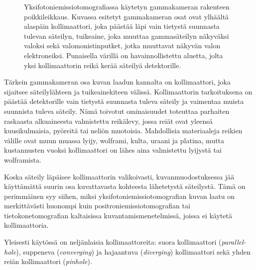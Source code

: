 \begin{figure}[H]
    \centering
    \captionsetup{width=.9\textwidth}
    
    \caption{Yksifotoniemissiotomografiassa käytetyn gammakameran rakenteen poikkileikkaus. Kuvassa esitetyt gammakameran osat ovat ylhäältä alaspäin kollimaattori, joka päästää läpi vain tietystä suunnasta tulevan säteilyn, tuikeaine, joka muuttaa gammasäteilyn näkyväksi valoksi sekä valomonistinputket, jotka muuttavat näkyvän valon elektroneiksi. Punaisella värillä on havainnollistettu aluetta, jolta yksi kollimaattorin reikä kerää säteilyä detektorille.}
    \label{fig:spect-detektori}
\end{figure}

Tärkein gammakameran osa kuvan laadun kannalta on kollimaattori, joka sijaitsee säteilylähteen ja tuikeainekiteen välissä. Kollimaattorin tarkoituksena on päästää detektorille vain tietystä suunnasta tuleva säteily ja vaimentaa muista suunnista tuleva säteily. Nämä toivotut ominaisuudet toteuttaa parhaiten raskaasta alkuaineesta valmistettu reikälevy, jossa reiät ovat yleensä kuusikulmaisia, pyöreitä tai neliön muotoisia.\cite{van_audenhaege_review_2015, cherry_gamma_2012} Mahdollisia materiaaleja reikien välille ovat muun muassa lyijy, wolframi, kulta, uraani ja platina\cite{van_audenhaege_review_2015}, mutta kustannusten vuoksi\cite{van_audenhaege_review_2015} kollimaattori on lähes aina valmistettu lyijystä tai wolframista.\cite{cherry_gamma_2012}

Koska säteily läpäisee kollimaattorin valikoivasti, kuvanmuodostuksessa jää käyttämättä suurin osa kuvattavasta kohteesta lähetetystä säteilystä. Tämä on perimmäinen syy siihen, miksi yksifotoniemissiotomografian kuvan laatu on merkittävästi huonompi kuin positroniemissiotomografian tai tietokonetomografian kaltaisissa kuvantamismenetelmissä, joissa ei käytetä kollimaattoria.\cite{cherry_gamma_2012}

Yleisesti käytössä on neljänlaisia kollimaattoreita: suora kollimaattori (\textit{parallel-hole}), suppeneva (\textit{converging}) ja hajaantuva (\textit{diverging}) kollimaattori sekä yhden reiän kollimaattori (\textit{pinhole})\cite{cherry_gamma_2012, van_audenhaege_review_2015}.

